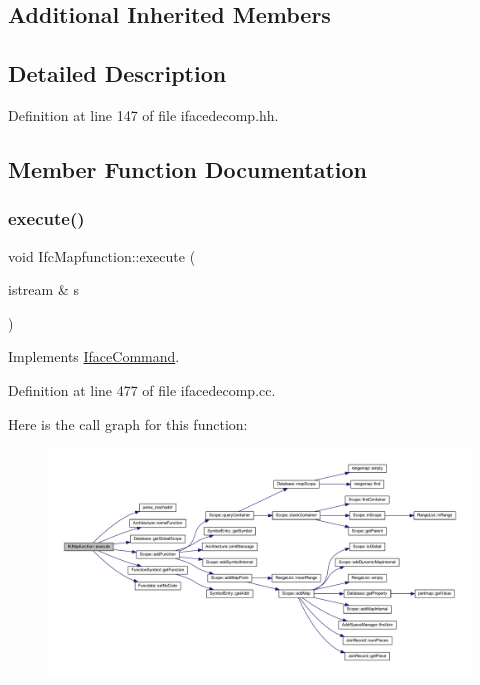 \subsection*{Additional Inherited Members}


\subsection{Detailed Description}


Definition at line 147 of file ifacedecomp.\+hh.



\subsection{Member Function Documentation}
\mbox{\label{class_ifc_mapfunction_acf9d7edac75150821f0b9c6318e11dea}} 
\subsubsection{\texorpdfstring{execute()}{execute()}}
{\footnotesize\ttfamily void Ifc\+Mapfunction\+::execute (\begin{DoxyParamCaption}\item[{istream \&}]{s }\end{DoxyParamCaption})\hspace{0.3cm}{\ttfamily [virtual]}}



Implements \mbox{\hyperlink{class_iface_command_af10e29cee2c8e419de6efe9e680ad201}{Iface\+Command}}.



Definition at line 477 of file ifacedecomp.\+cc.

Here is the call graph for this function\+:
\nopagebreak
\begin{figure}[H]
\begin{center}
\leavevmode
\includegraphics[width=350pt]{class_ifc_mapfunction_acf9d7edac75150821f0b9c6318e11dea_cgraph}
\end{center}
\end{figure}


